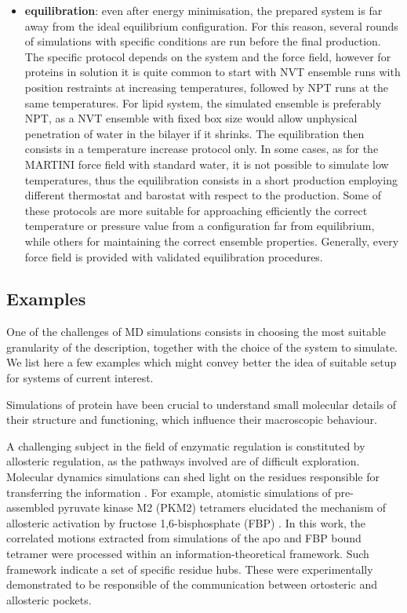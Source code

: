 \documentclass[graybox]{svmult}
\begin{document}
\begin{itemize}
%
\item \textbf{equilibration}: even after energy minimisation, the prepared system is far away from the ideal equilibrium configuration. For this reason, several rounds of simulations with specific conditions are run before the final production. The specific protocol depends on the system and the force field, however for proteins in solution it is quite common to start with NVT ensemble runs with position restraints at increasing temperatures, followed by NPT runs at the same temperatures. For lipid system, the simulated ensemble is preferably NPT, as a NVT ensemble with fixed box size would allow unphysical penetration of water in the bilayer if it shrinks. The equilibration then consists in a temperature increase protocol only. In some cases, as for the MARTINI force field with standard water, it is not possible to simulate low temperatures, thus the equilibration consists in a short production employing different thermostat and barostat with respect to the production. Some of these protocols are more suitable for approaching efficiently the correct temperature or pressure value from a configuration far from equilibrium, while others for maintaining the correct ensemble properties. Generally, every force field is provided with validated equilibration procedures.
\end{itemize}




\subsection{Examples} \label{examples}
One of the challenges of MD simulations consists in choosing the most suitable granularity of the description, together with the choice of the system to simulate. We list here a few examples which might convey better the idea of suitable setup  for systems of current interest.

Simulations of protein have been crucial to understand small molecular details of their structure and functioning, which influence their macroscopic behaviour.

A challenging subject in the field of enzymatic regulation is constituted by allosteric regulation, as the pathways involved are of difficult exploration. Molecular dynamics simulations can shed light on the residues responsible for transferring the information \cite{Pandini2012}.
%
For example, atomistic simulations of pre-assembled pyruvate kinase M2 (PKM2) tetramers elucidated the mechanism of allosteric activation by fructose 1,6-bisphosphate (FBP) \cite{Macpherson2019}. In this work, the correlated motions extracted from simulations of the apo and FBP bound tetramer were processed within an information-theoretical framework. Such framework indicate a set of specific residue hubs. These were experimentally demonstrated to be responsible of the communication between ortosteric and allosteric pockets.
\end{document}
